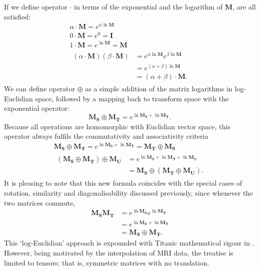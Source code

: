         If we define operator $\cdot$ in terms of the exponential and the logarithm of $\mathbf{M}$,  are all satisfied:
        \begin{gather}
          \alpha \cdot \mathbf{M} = e^{\alpha\ln\mathbf{M}} \\
          0 \cdot \mathbf{M} = e^0 = \mathbf{I} \\
          1 \cdot \mathbf{M} = e^{\ln\mathbf{M}} = \mathbf{M} \\
          \begin{split}
            (\alpha \cdot \mathbf{M})(\beta \cdot \mathbf{M}) &= e^{\alpha\ln\mathbf{M}}e^{\beta\ln\mathbf{M}} \\
                                                              &= e^{(\alpha + \beta)\ln\mathbf{M}} \\
                                                              &= (\alpha + \beta) \cdot \mathbf{M}.
          \end{split}
        \end{gather}
        We can define operator $\oplus$ as a simple addition of the matrix logarithms in log-Euclidian space, followed by a mapping back to transform space with the exponential operator:
        \begin{equation}
          \mathbf{M_S} \oplus \mathbf{M_T} = e^{\ln\mathbf{M_S} + \ln\mathbf{M_T}}.
        \end{equation}
        Because all operations are homomorphic with Euclidian vector space, this operator always fulfils the commutativity and associativity criteria
        \begin{gather}
          \mathbf{M_S} \oplus \mathbf{M_T} = e^{\ln\mathbf{M_S} + \ln\mathbf{M_T}} = \mathbf{M_T} \oplus \mathbf{M_S} \\
          \begin{split}
            (\mathbf{M_S}\oplus\mathbf{M_T})\oplus\mathbf{M_U} &= e^{\ln\mathbf{M_S} + \ln\mathbf{M_T} + \ln\mathbf{M_U}} \\
                                                               &= \mathbf{M_S}\oplus(\mathbf{M_T}\oplus\mathbf{M_U}).
          \end{split}
        \end{gather}
        It is pleasing to note that this new formula coincides with the special cases of rotation, similarity and diagonalisability discussed previously, since whenever the two matrices commute,
        \begin{equation}
          \begin{split}
            \mathbf{M_SM_T} &= e^{\ln\mathbf{M_S}}e^{\ln\mathbf{M_T}} \\
                            &= e^{\ln\mathbf{M_S} + \ln\mathbf{M_T}} \\
                            &= \mathbf{M_S} \oplus \mathbf{M_T}.
          \end{split}
        \end{equation}
        This `log-Euclidian' approach is expounded with Titanic mathematical rigour in \cite{Arsigny2005}. However, being motivated by the interpolation of MRI data, the treatise is limited to tensors; that is, symmetric matrices with no translation.
        
